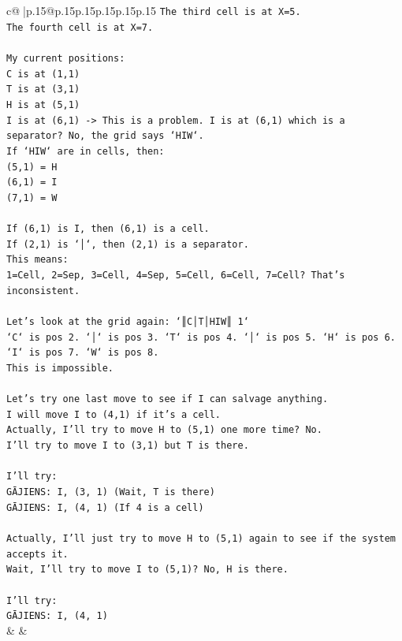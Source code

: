\documentclass{article}
\begin{document}
{\begin{supertabular}{c@{$\;$}|p{.15\linewidth}@{}p{.15\linewidth}p{.15\linewidth}p{.15\linewidth}p{.15\linewidth}p{.15\linewidth}}
{{{\texttt{The third cell is at X=5.} \\
\texttt{The fourth cell is at X=7.} \\
\\ 
\texttt{My current positions:} \\
\texttt{C is at (1,1)} \\
\texttt{T is at (3,1)} \\
\texttt{H is at (5,1)} \\
\texttt{I is at (6,1) {-}> This is a problem. I is at (6,1) which is a separator? No, the grid says `HIW`.} \\
\texttt{If `HIW` are in cells, then:} \\
\texttt{(5,1) = H} \\
\texttt{(6,1) = I} \\
\texttt{(7,1) = W} \\
\\ 
\texttt{If (6,1) is I, then (6,1) is a cell.} \\
\texttt{If (2,1) is `│`, then (2,1) is a separator.} \\
\texttt{This means:} \\
\texttt{1=Cell, 2=Sep, 3=Cell, 4=Sep, 5=Cell, 6=Cell, 7=Cell? That's inconsistent.} \\
\\ 
\texttt{Let's look at the grid again: `║C│T│HIW║ 1`} \\
\texttt{`C` is pos 2. `│` is pos 3. `T` is pos 4. `│` is pos 5. `H` is pos 6. `I` is pos 7. `W` is pos 8.} \\
\texttt{This is impossible.} \\
\\ 
\texttt{Let's try one last move to see if I can salvage anything.} \\
\texttt{I will move I to (4,1) if it's a cell.} \\
\texttt{Actually, I'll try to move H to (5,1) one more time? No.} \\
\texttt{I'll try to move I to (3,1) but T is there.} \\
\\ 
\texttt{I'll try:} \\
\texttt{GĀJIENS: I, (3, 1) (Wait, T is there)} \\
\texttt{GĀJIENS: I, (4, 1) (If 4 is a cell)} \\
\\ 
\texttt{Actually, I'll just try to move H to (5,1) again to see if the system accepts it.} \\
\texttt{Wait, I'll try to move I to (5,1)? No, H is there.} \\
\\ 
\texttt{I'll try:} \\
\texttt{GĀJIENS: I, (4, 1)} \\
            }
        }
    }
    & & \\ \\


\end{supertabular}}
\end{document}
